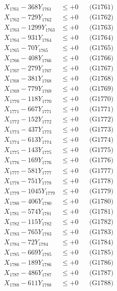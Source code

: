 \documentclass[a4paper,10pt]{article}
\begin{document}
{\begin{align}
\allowbreak
X_{1761} - 368Y_{1761} &\leq +0 && \text{(G1761)} \\
X_{1762} - 729Y_{1762} &\leq +0 && \text{(G1762)} \\
X_{1763} - 1299Y_{1763} &\leq +0 && \text{(G1763)} \\
X_{1764} - 931Y_{1764} &\leq +0 && \text{(G1764)} \\
X_{1765} - 70Y_{1765} &\leq +0 && \text{(G1765)} \\
X_{1766} - 408Y_{1766} &\leq +0 && \text{(G1766)} \\
X_{1767} - 279Y_{1767} &\leq +0 && \text{(G1767)} \\
X_{1768} - 381Y_{1768} &\leq +0 && \text{(G1768)} \\
X_{1769} - 779Y_{1769} &\leq +0 && \text{(G1769)} \\
X_{1770} - 118Y_{1770} &\leq +0 && \text{(G1770)} \\
\allowbreak
X_{1771} - 667Y_{1771} &\leq +0 && \text{(G1771)} \\
X_{1772} - 152Y_{1772} &\leq +0 && \text{(G1772)} \\
X_{1773} - 437Y_{1773} &\leq +0 && \text{(G1773)} \\
X_{1774} - 613Y_{1774} &\leq +0 && \text{(G1774)} \\
X_{1775} - 143Y_{1775} &\leq +0 && \text{(G1775)} \\
X_{1776} - 169Y_{1776} &\leq +0 && \text{(G1776)} \\
X_{1777} - 581Y_{1777} &\leq +0 && \text{(G1777)} \\
X_{1778} - 751Y_{1778} &\leq +0 && \text{(G1778)} \\
X_{1779} - 1045Y_{1779} &\leq +0 && \text{(G1779)} \\
X_{1780} - 406Y_{1780} &\leq +0 && \text{(G1780)} \\
\allowbreak
X_{1781} - 574Y_{1781} &\leq +0 && \text{(G1781)} \\
X_{1782} - 115Y_{1782} &\leq +0 && \text{(G1782)} \\
X_{1783} - 765Y_{1783} &\leq +0 && \text{(G1783)} \\
X_{1784} - 72Y_{1784} &\leq +0 && \text{(G1784)} \\
X_{1785} - 669Y_{1785} &\leq +0 && \text{(G1785)} \\
X_{1786} - 189Y_{1786} &\leq +0 && \text{(G1786)} \\
X_{1787} - 486Y_{1787} &\leq +0 && \text{(G1787)} \\
X_{1788} - 611Y_{1788} &\leq +0 && \text{(G1788)} \\

\end{align}}
\end{document}
